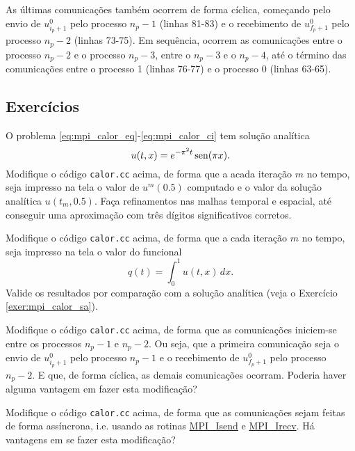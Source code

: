 As últimas comunicações também ocorrem de forma cíclica, começando pelo envio de $u^0_{i_p+1}$ pelo processo $n_p-1$ (linhas 81-83) e o recebimento de $u^0_{f_p+1}$ pelo processo $n_p-2$ (linhas 73-75). Em sequência, ocorrem as comunicações entre o processo $n_p-2$ e o processo $n_p-3$, entre o $n_p-3$ e o $n_p-4$, até o término das comunicações entre o processo 1 (linhas 76-77) e o processo 0 (linhas 63-65).

\subsection{Exercícios}

\begin{exer}\label{exer:mpi_calor_sa}
  O problema \eqref{eq:mpi_calor_eq}-\eqref{eq:mpi_calor_ci} tem solução analítica
  \begin{equation}
    u(t,x) = e^{-\pi^2 t}\operatorname{sen}(\pi x). 
  \end{equation}
  Modifique o código \verb+calor.cc+ acima, de forma que a acada iteração $m$ no tempo, seja impresso na tela o valor de $u^m(0.5)$ computado e o valor da solução analítica $u(t_m, 0.5)$. Faça refinamentos nas malhas temporal e espacial, até conseguir uma aproximação com três dígitos significativos corretos.
\end{exer}

\begin{exer}
  Modifique o código \verb+calor.cc+ acima, de forma que a cada iteração $m$ no tempo, seja impresso na tela o valor do funcional
  \begin{equation}
    q(t) = \int_0^1 u(t,x)\,dx.
  \end{equation}
  Valide os resultados por comparação com a solução analítica (veja o Exercício \eqref{exer:mpi_calor_sa}).
\end{exer}

\begin{exer}
  Modifique o código \verb+calor.cc+ acima, de forma que as comunicações iniciem-se entre os processos $n_p-1$ e $n_p-2$. Ou seja, que a primeira comunicação seja o envio de $u^0_{i_p+1}$ pelo processo $n_p-1$ e o recebimento de $u^0_{f_p+1}$ pelo processo $n_p-2$. E que, de forma cíclica, as demais comunicações ocorram. Poderia haver alguma vantagem em fazer esta modificação?
\end{exer}

\begin{exer}
  Modifique o código \verb+calor.cc+ acima, de forma que as comunicações sejam feitas de forma assíncrona, i.e. usando as rotinas \href{https://www.open-mpi.org/doc/v1.8/man3/MPI\_Isend.3.php}{MPI\_Isend} e \href{https://www.open-mpi.org/doc/v1.8/man3/MPI\_Irecv.3.php}{MPI\_Irecv}. Há vantagens em se fazer esta modificação?
\end{exer}

